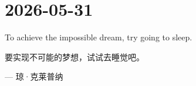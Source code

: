 \section*{2026-05-31}
To achieve the impossible dream, try going to sleep. \par
要实现不可能的梦想，试试去睡觉吧。 \par
\hfill --- 琼·克莱普纳 \par
